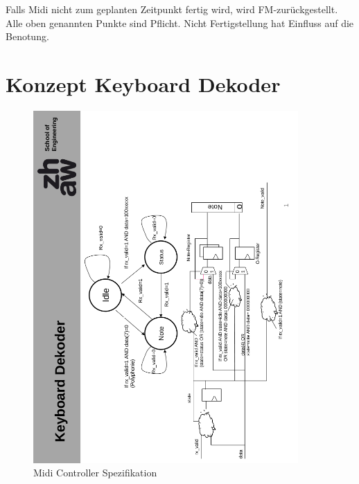 Falls Midi nicht zum geplanten Zeitpunkt fertig wird, wird FM-zurückgestellt. Alle oben genannten Punkte sind Pflicht.
Nicht Fertigstellung hat Einfluss auf die Benotung.




\chapter{Konzept Keyboard Dekoder}\label{chap.anhang_hans_midicontrol}
\begin{figure}[H]
	\centering
	\includegraphics[width=0.9\textwidth]{images/midi_interface/Midi_Konzept_midi_control.png}
	\caption{Midi Controller Spezifikation}
	\label{fig.Hans_midicontrol}
\end{figure}






